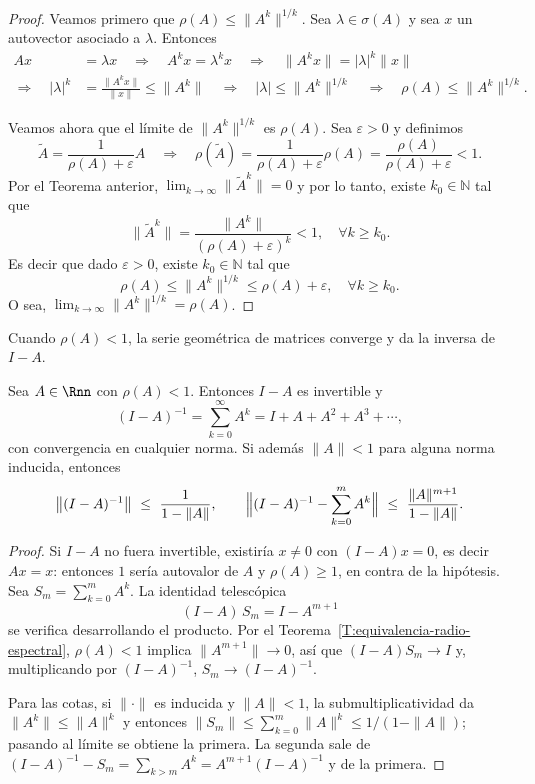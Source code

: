 \begin{proof}
  Veamos primero que $\rho(A)\le \| A^k \|^{1/k}$. Sea $\lambda \in \sigma(A)$ y sea $x$ un autovector asociado a $\lambda$. Entonces
  \begin{align*}
    Ax &= \lambda x \quad\Longrightarrow\quad
    A^k x = \lambda ^k x \quad\Longrightarrow\quad
    \| A^k x \| = |\lambda|^k \| x \| \\
    \Longrightarrow\quad |\lambda|^k &= \frac{\| A^k x \|}{\| x \|} \le \| A^k \|
    \quad\Longrightarrow\quad |\lambda| \le  \| A^k \|^{1/k}
    \quad\Longrightarrow\quad \rho(A)  \le  \| A^k \|^{1/k}.
  \end{align*}

  Veamos ahora que el límite de $\| A^k \|^{1/k}$ es $\rho(A)$.
  Sea $\varepsilon > 0$ y definimos
  \[
  \tilde A = \frac{1}{\rho(A) + \varepsilon} A \quad\Longrightarrow\quad
  \rho(\tilde A) = \frac{1}{\rho(A) + \varepsilon} \rho(A) = \frac{\rho(A)}{\rho(A)+\varepsilon} < 1.
  \]
  Por el Teorema anterior, $\displaystyle \lim_{k\to\infty} \|\tilde A^k \| = 0$ y
  por lo tanto, existe $k_0 \in \mathbb{N}$ tal que
  \[
  \| \tilde A^k \| = \frac{\|A^k\|}{(\rho(A)+\varepsilon)^k} < 1 , \quad\forall k \ge k_0.
  \]
  Es decir que dado $\varepsilon > 0$, existe $k_0\in\mathbb{N}$ tal que
  \[
  \rho(A) \le \| A^k \|^{1/k} \le \rho(A) + \varepsilon,  \quad\forall k \ge k_0.
  \]
  O sea, $\lim_{k\to\infty} \| A^k \|^{1/k} = \rho(A)$.
\end{proof}

Cuando $\rho(A)<1$, la serie geométrica de matrices converge y da la inversa de
$I-A$.

\begin{thm}\label{T:neumann}
Sea $A\in\Rnn$ con $\rho(A)<1$. Entonces $I-A$ es invertible y
\[
(I-A)^{-1}=\sum_{k=0}^{\infty}A^{k}=I+A+A^{2}+A^{3}+\cdots ,
\]
con convergencia en cualquier norma. Si además $\|A\|<1$ para alguna norma
inducida, entonces
\[
\bigl\|(I-A)^{-1}\bigr\|\ \le\ \frac{1}{1-\|A\|} ,
\qquad
\Bigl\|(I-A)^{-1}-\sum_{k=0}^{m}A^{k}\Bigr\|\ \le\ \frac{\|A\|^{m+1}}{1-\|A\|} .
\]
\end{thm}

\begin{proof}
Si $I-A$ no fuera invertible, existiría $x\neq0$ con $(I-A)x=0$, es decir
$Ax=x$: entonces $1$ sería autovalor de $A$ y $\rho(A)\ge1$, en contra de la
hipótesis. Sea $S_m=\sum_{k=0}^{m}A^{k}$. La identidad telescópica
\[
(I-A)\,S_m = I-A^{m+1}
\]
se verifica desarrollando el producto. Por el
Teorema~\ref{T:equivalencia-radio-espectral}, $\rho(A)<1$ implica
$\|A^{m+1}\|\to0$, así que $(I-A)S_m\to I$ y, multiplicando por
$(I-A)^{-1}$, $S_m\to(I-A)^{-1}$.

Para las cotas, si $\|\cdot\|$ es inducida y $\|A\|<1$, la submultiplicatividad
da $\|A^k\|\le\|A\|^k$ y entonces
$\|S_m\|\le\sum_{k=0}^m\|A\|^k\le 1/(1-\|A\|)$; pasando al límite se obtiene
la primera. La segunda sale de
$(I-A)^{-1}-S_m=\sum_{k>m}A^{k}=A^{m+1}(I-A)^{-1}$ y de la primera.
\end{proof}

